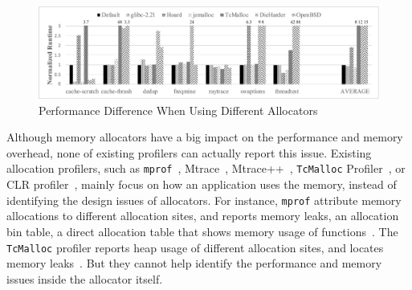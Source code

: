 

\begin{figure}[!ht]
\centering
\includegraphics[width=5in]{figures/regular-performance}
\caption{Performance Difference When Using Different Allocators\label{fig:motivation}}
\end{figure}


Although memory allocators have a big impact on the performance and memory overhead, none of existing profilers can actually report this issue. Existing allocation profilers, such as \texttt{mprof}~\citep{Zorn:1988:MAP:894814}, Mtrace~\citep{mtrace}, Mtrace++~\citep{Lee:2000:DMM:786772.787150}, \texttt{TcMalloc} Profiler~\citep{tcmalloc-profiler}, or CLR profiler~\citep{lupasc2014dynamic}, mainly focus on how an application uses the memory, instead of identifying the design issues of allocators. For instance, \texttt{mprof} attribute memory allocations to different allocation sites, and reports memory leaks, an allocation bin table, a direct allocation table that shows memory usage of functions~\citep{Zorn:1988:MAP:894814}. The \texttt{TcMalloc} profiler reports heap usage of different allocation sites, and locates memory leaks~\citep{tcmalloc-profiler}. But they cannot help identify the performance and memory issues inside the allocator itself. 


